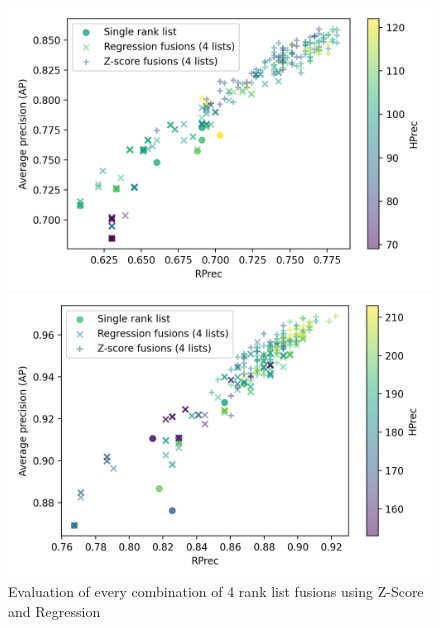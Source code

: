 \begin{figure}
  \centering
  \caption{Evaluation of every combination of 4 rank list fusions using Z-Score and Regression}
  \label{fig:fusions}

  \label{fig:fusion_evaluation_A}
  \includegraphics[width=\linewidth]{img/fusion_evaluation_A.png}

  \vspace{0.5cm}

  \label{fig:fusion_evaluation_B}
  \includegraphics[width=\linewidth]{img/fusion_evaluation_B.png}
\end{figure}

